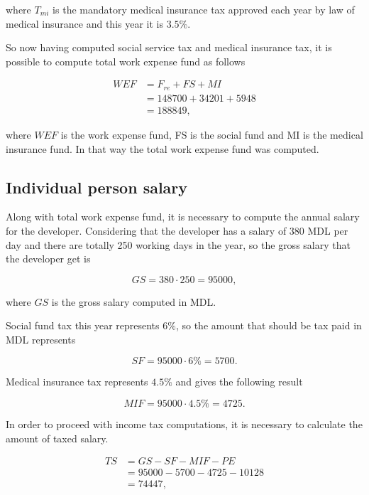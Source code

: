 \noindent
where $T_{mi}$ is the mandatory medical insurance tax approved each year by law of medical insurance and this year it is $3.5\%$. 

So now having computed social service tax and medical insurance tax, it is possible to compute total work expense fund as follows

\begin{equation}
\begin{split}
 WEF &= F_{re} + FS + MI\\
     &= 148700 + 34201 + 5948\\
     &= 188849,
\end{split}
\end{equation}

\noindent
where $WEF$ is the work expense fund, FS is the social fund and MI is the medical insurance fund. In that way the total work expense fund was computed.


\subsection{Individual person salary}
Along with total work expense fund, it is necessary to compute the annual salary for the developer. Considering that the developer has a salary of 380 MDL per day and there are totally 250 working days in the year, so the gross salary that the developer get is

\begin{equation}
 GS = 380 \cdot 250 = 95000,
\end{equation}

\noindent where $GS$ is the gross salary computed in MDL.

Social fund tax this year represents $6\%$, so the amount that should be tax paid in MDL represents

\begin{equation}
 SF = 95000 \cdot 6\% = 5700.
\end{equation}

Medical insurance tax represents $4.5\%$ and gives the following result

\begin{equation}
 MIF = 95000 \cdot 4.5\% = 4725.
\end{equation}

In order to proceed with income tax computations, it is necessary to calculate the amount of taxed salary.

\begin{equation}
\begin{split}
 TS &= GS - SF - MIF - PE \\
              &= 95000 - 5700 - 4725 - 10128\\ 
              &= 74447,
\end{split}
\end{equation}

